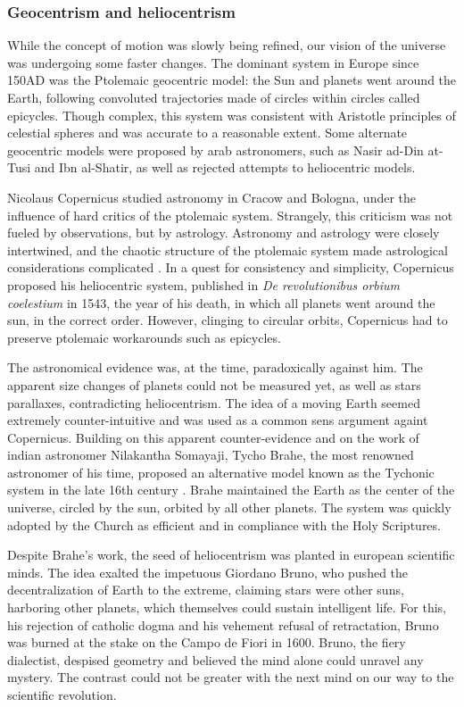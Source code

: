 \subsubsection*{Geocentrism and heliocentrism}

While the concept of motion was slowly being refined, our vision of the universe was undergoing some faster changes. The dominant system in Europe since 150AD was the Ptolemaic geocentric model: the Sun and planets went around the Earth, following convoluted trajectories made of circles within circles called epicycles. Though complex, this system was consistent with Aristotle principles of celestial spheres and was accurate to a reasonable extent. Some alternate geocentric models were proposed by arab astronomers, such as Nasir ad-Din at-Tusi and Ibn al-Shatir, as well as rejected attempts to heliocentric models.

Nicolaus Copernicus studied astronomy in Cracow and Bologna, under the influence of hard critics of the ptolemaic system. Strangely, this criticism was not fueled by observations, but by astrology. Astronomy and astrology were closely intertwined, and the chaotic structure of the ptolemaic system made astrological considerations complicated \citep{barker2014}. In a quest for consistency and simplicity, Copernicus proposed his heliocentric system, published in \textit{De revolutionibus orbium coelestium} in 1543, the year of his death, in which all planets went around the sun, in the correct order. However, clinging to circular orbits, Copernicus had to preserve ptolemaic workarounds such as epicycles. 

The astronomical evidence was, at the time, paradoxically against him. The apparent size changes of planets could not be measured yet, as well as stars parallaxes, contradicting heliocentrism. The idea of a moving Earth seemed extremely counter-intuitive and was used as a common sens argument againt Copernicus. Building on this apparent counter-evidence and on the work of indian astronomer Nilakantha Somayaji, Tycho Brahe, the most renowned astronomer of his time, proposed an alternative model known as the Tychonic system in the late 16th century \citep{ramasubramanian1998}. Brahe maintained the Earth as the center of the universe, circled by the sun, orbited by all other planets. The system was quickly adopted by the Church as efficient and in compliance with the Holy Scriptures.

Despite Brahe's work, the seed of heliocentrism was planted in european scientific minds. The idea exalted the impetuous Giordano Bruno, who pushed the decentralization of Earth to the extreme, claiming stars were other suns, harboring other planets, which themselves could sustain intelligent life. For this, his rejection of catholic dogma and his vehement refusal of retractation, Bruno was burned at the stake on the Campo de Fiori in 1600. Bruno, the fiery dialectist, despised geometry and believed the mind alone could unravel any mystery. The contrast could not be greater with the next mind on our way to the scientific revolution.

